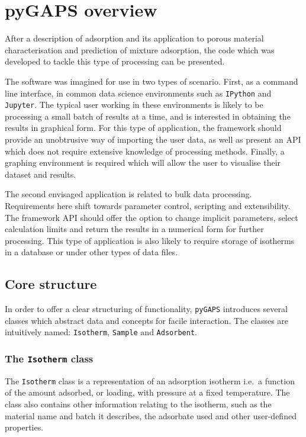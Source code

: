 
\section{pyGAPS overview}

After a description of adsorption and its application to porous
material characterisation and prediction of mixture
adsorption, the code which was developed to tackle this type 
of processing can be presented.

The software was imagined for use in two types of scenario.
First, as a command line interface, in common data science environments
such as \texttt{IPython} and \texttt{Jupyter}. The typical user working
in these environments is likely to be processing a small batch of
results at a time, and is interested in obtaining the results in
graphical form. For this type of application, the framework should
provide an unobtrusive way of importing the user data, as well as
present an API which does not require extensive knowledge of 
processing methods. Finally, a graphing environment is
required which will allow the user to visualise their
dataset and results.

The second envisaged application is related to bulk data processing.
Requirements here shift towards parameter control, scripting and
extensibility. The framework API should offer the option to change 
implicit parameters, select calculation limits and return the results
in a numerical form for further processing. This type of application 
is also likely to require storage of isotherms in a database or
under other types of data files.

\subsection{Core structure}

In order to offer a clear structuring of functionality, 
\texttt{pyGAPS} introduces several classes which abstract data and
concepts for facile interaction. The classes are
intuitively named: \texttt{Isotherm}, \texttt{Sample} and \texttt{Adsorbent}.

\subsubsection{The \texttt{Isotherm} class}

The \texttt{Isotherm} class is a representation of an adsorption 
isotherm i.e.\ a function of the amount adsorbed, or loading, 
with pressure at a fixed temperature. The class also contains
other information relating to the isotherm, such as the material
name and batch it describes, the adsorbate used and other 
user-defined properties.

